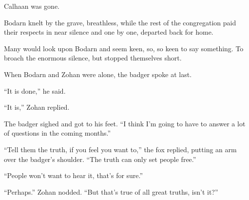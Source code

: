 Calhaan was gone.

Bodarn knelt by the grave, breathless, while the rest of the congregation paid their respects in near silence and one by one, departed back for home.

Many would look upon Bodarn and seem keen, so, so keen to say something. To broach the enormous silence, but stopped themselves short.

When Bodarn and Zohan were alone, the badger spoke at last.

``It is done,'' he said.

``It is,'' Zohan replied.

The badger sighed and got to his feet. ``I think I'm going to have to answer a lot of questions in the coming months.''

``Tell them the truth, if you feel you want to,'' the fox replied, putting an arm over the badger's shoulder. ``The truth can only set people free.''

``People won't want to hear it, that's for sure.''

``Perhaps.'' Zohan nodded. ``But that's true of all great truths, isn't it?''
